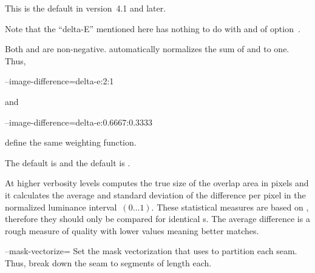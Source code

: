 \begin{codelist}
\begin{codelist}
    This is the default in \App{} version~4.1 and later.

    Note that the ``delta-E'' mentioned here has nothing to do with  and
     of option~.
  \end{codelist}

  \begin{sloppypar}
    Both  and  are non-negative.
    \App{} automatically normalizes the sum of  and
     to one.  Thus,
  \end{sloppypar}

  \begin{literal}
    --image-difference=delta-e:2:1
  \end{literal}

  and

  \begin{literal}
    --image-difference=delta-e:0.6667:0.3333
  \end{literal}

  define the same weighting function.

  The default  is 
  and the default  is
  .

  At higher verbosity levels \App{} computes the true size of the overlap area in pixels and it
  calculates the average and standard deviation of the difference per pixel in the normalized
  luminance interval~$(0\dots1)$.  These statistical measures are based on ,
  therefore they should only be compared for identical s.  The average
  difference is a rough measure of quality with lower values meaning better matches.


  \label{opt:mask-vectorize}%
\item[--mask-vectorize=\metavar{DISTANCE}]\itemend
  Set the mask vectorization  that \App{} uses to partition each seam.  Thus,
  break down the seam to segments of length  each.


\end{codelist}
